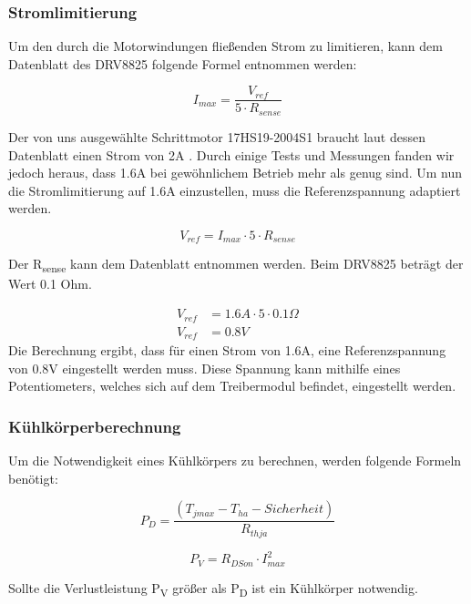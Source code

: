\subsubsection{Stromlimitierung}
Um den durch die Motorwindungen fließenden Strom zu limitieren, kann dem Datenblatt des DRV8825 folgende Formel entnommen werden:

\begin{equation}
    I_{max} = \frac{V_{ref}} {5 \cdot R_{sense}}
\end{equation}

Der von uns ausgewählte Schrittmotor 17HS19-2004S1 braucht laut dessen Datenblatt einen Strom von 2A .
Durch einige Tests und Messungen fanden wir jedoch heraus, dass 1.6A bei gewöhnlichem Betrieb mehr als genug sind.
Um nun die Stromlimitierung auf 1.6A einzustellen, muss die Referenzspannung adaptiert werden.

\begin{equation*}
    V_{ref} = I_{max} \cdot 5 \cdot R_{sense}
\end{equation*}

Der R\textsubscript{sense} kann dem Datenblatt entnommen werden.
Beim DRV8825 beträgt der Wert 0.1 Ohm.

\begin{align*}
    V_{ref} &= 1.6A \cdot 5 \cdot 0.1\Omega \\
    V_{ref} &= 0.8V
\end{align*}
Die Berechnung ergibt, dass für einen Strom von 1.6A, eine Referenzspannung von 0.8V eingestellt werden muss.
Diese Spannung kann mithilfe eines Potentiometers, welches sich auf dem Treibermodul befindet, eingestellt werden.

\subsubsection{Kühlkörperberechnung}
Um die Notwendigkeit eines Kühlkörpers zu berechnen, werden folgende Formeln benötigt:

\begin{equation}
    P_D = \frac{(T_{jmax} - T_{ha} - Sicherheit)}{R_{thja}}
\end{equation}

\begin{equation}
    P_V = R_{DSon} \cdot I_{max}^2
\end{equation}

Sollte die Verlustleistung P\textsubscript{V} größer als P\textsubscript{D} ist ein Kühlkörper notwendig. \\

